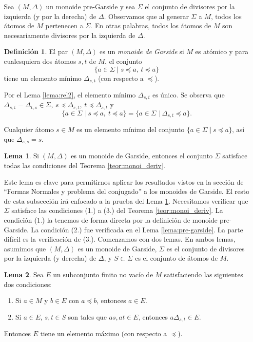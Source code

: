\documentclass[12pt]{book}
\theoremstyle{definition}
\newtheorem{defi}{Definición}[section]
\newtheorem{lema}{Lema}[section]
\begin{document}
Sea $(M,\Delta)$ un monoide pre-Garside y sea $\Sigma$ el conjunto de divisores por la izquierda (y por la derecha) de $\Delta$. Observamos que al generar $\Sigma$ a $M$, todos los átomos de $M$ pertenecen a $\Sigma$. En otras palabras, todos los átomos de $M$ son necesariamente divisores por la izquierda de $\Delta$.

\begin{defi}
El par $(M,\Delta)$ es un \textit{monoide de Garside} si $M$ es atómico y para cualesquiera dos átomos $s,t$ de $M$, el conjunto
$$\{a\in\Sigma\mid s\preceq a,\ t\preceq a \}$$
tiene un elemento mínimo $\Delta_{s,t}$ (con respecto a $\preceq$).

Por el Lema \ref{lema:rel2}, el elemento mínimo $\Delta_{s,t}$ es único. Se observa que $\Delta_{s,t}=\Delta_{t,s}\in\Sigma,\ s\preceq\Delta_{s,t},\ t\preceq\Delta_{s,t}$ y 
$$\{a\in\Sigma\mid s\preceq a,\ t\preceq a \}=\{a\in\Sigma\mid \Delta_{s,t}\preceq a\}.$$

Cualquier átomo $s\in M$ es un elemento mínimo del conjunto $\{a\in\Sigma\mid s\preceq a\}$, así que $\Delta_{s,s}=s$.
\label{defi:garside}
\end{defi}

\begin{lema}
Si $(M,\Delta)$ es un monoide de Garside, entonces el conjunto $\Sigma$ satisface todas las condiciones del Teorema \ref{teor:monoi_deriv}.
\label{lema:garside}
\end{lema}

Este lema es clave para permitirnos aplicar los resultados vistos en la sección de ``Formas Normales y problema del conjugado'' a los monoides de Garside. El resto de esta subsección irá enfocado a la prueba del Lema \ref{lema:garside}. Necesitamos verificar que $\Sigma$ satisface las condiciones (1.) a (3.) del Teorema \ref{teor:monoi_deriv}. La condición (1.) la tenemos de forma directa por la definición de monoide pre-Garside. La condición (2.) fue verificada en el Lema \ref{lema:pre-garside}. La parte difícil es la verificación de (3.). Comenzamos con dos lemas. En ambos lemas, asumimos que $(M,\Delta)$ es un monoide de Garside, $\Sigma$ es el conjunto de divisores por la izquierda (y derecha) de $\Delta$, y $S\subset \Sigma$ es el conjunto de átomos de $M$.

\begin{lema}
Sea $E$ un subconjunto finito no vacío de $M$ satisfaciendo las siguientes dos condiciones:
\begin{enumerate}[label=(\roman*).]
\item Si $a\in M$ y $b\in E$ con $a\preceq b$, entonces $a\in E$.
\item Si $a\in E$, $s,t\in S$ son tales que $as,at\in E$, entonces $a\Delta_{s,t}\in E$.
\end{enumerate}
Entonces $E$ tiene un elemento máximo (con respecto a $\preceq$).
\label{lema:garside1}
\end{lema}
\end{document}
